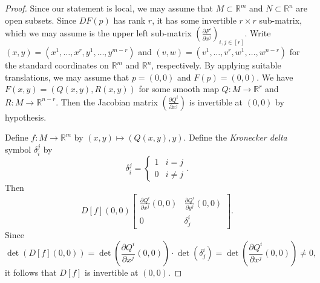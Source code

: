 \documentclass[10pt,letterpaper,cm]{nupset}
\theoremstyle{definition}
\theoremstyle{theorem}
\theoremstyle{remark}
\newcommand{\R}{\mathbb R}
\newcommand{\1}{\mathbf{1}}
\newcommand{\0}{\vec 0}
\begin{document}
\begin{proof}
Since our statement is local, we may assume that $M\subset \R^m$ and $N\subset \R^n$ are open subsets. Since $DF(p)$ has rank $r$, it has some invertible $r\times r$ sub-matrix, which we may assume is the upper left sub-matrix $\left(\frac{\partial{F^i}}{\partial{x^j}}\right)_{i,j\in [r]}$. Write $\left(x,y\right) = \left(x^1, \ldots, x^r, y^1, \ldots, y^{m-r}\right)$ and $\left(v,w\right) = \left(v^1, \ldots, v^r, w^1, \ldots, w^{n-r}\right)$ for the standard coordinates on $\R^m$ and $\R^n$, respectively. By applying suitable translations, we may assume that $p=\left(0,0\right)$ and $F(p)= \left(0,0\right)$. We have $F(x,y)= \left(Q(x,y), R(x,y)\right)$ for some smooth map $Q: M \to \R^r$ and $R: M \to \R^{n-r}$. Then the Jacobian matrix $\left(\frac{\partial{Q^i}}{\partial{x^j}} \right)$ is invertible at $\left(0,0\right)$ by hypothesis. 

\medskip


Define $f : M \to \R^m$ by $\left(x,y\right) \mapsto \left(Q(x,y), y\right)$. Define the \textit{Kronecker delta} symbol $\delta_i^j$ by 
$$\delta_i^j = \begin{cases} 1 & i=j \\ 0 & i \ne j \end{cases}.$$  Then $$D[f]\left(0,0\right) \begin{bmatrix} \frac{\partial{Q^i}}{\partial{x^j}}\left(0,0\right) & \frac{\partial{Q^i}}{\partial{y^j}}\left(0,0\right) \\ 0 & \delta^i_j     \end{bmatrix}   .$$ Since $$\det(D[f]\left(0,0\right)) = \det \left( \frac{\partial{Q^i}}{\partial{x^j}}\left(0,0\right) \right) \cdot \det(\delta^i_j) = \det \left( \frac{\partial{Q^i}}{\partial{x^j}}\left(0,0\right)  \right) \ne 0,$$ it follows that $D[f]$ is invertible at $\left(0,0\right)$. 

\medskip


\end{proof}
\end{document}
